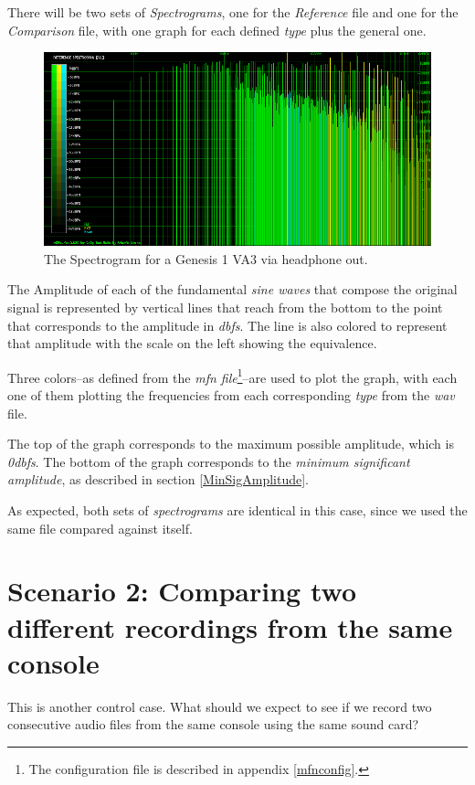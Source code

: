 \documentclass[10pt,a4paper]{report}
\newcommand{\ac}[1]{\textit{\acrshort{#1}}}
\newcommand{\db}[1]{\textit{#1\acrshort{dbfs}}}
\begin{document}
There will be two sets of \textit{Spectrograms}, one for the \textit{Reference} file and one for the \textit{Comparison} file, with one graph for each defined \textit{type} plus the general one.

\begin{figure}[H]
	\centering
	\includegraphics[width=1.0\linewidth]{images/interpretation/Plot1-SameFile-Spectrogram.png}
	\caption[Spectrogram]{The Spectrogram for a Genesis 1 VA3 via headphone out.}
	\label{fig:plot2-samefile-fm-spectrogram}
\end{figure}

The Amplitude of each of the fundamental \textit{sine waves} that compose the original signal is represented by vertical lines that reach from the bottom to the point that corresponds to the amplitude in \ac{dbfs}. The line is also colored to represent that amplitude with the scale on the left showing the equivalence.

Three colors--as defined from the \textit{mfn file}\footnote{The configuration file is described in appendix \ref{mfnconfig}.}--are used to plot the graph, with each one of them plotting the frequencies from each corresponding \textit{type} from the \ac{wav} file.

The top of the graph corresponds to the maximum possible amplitude, which is \db{0}. The bottom of the graph corresponds to the \textit{minimum significant amplitude}, as described in section \ref{MinSigAmplitude}.

As expected, both sets of \textit{spectrograms} are identical in this case, since we used the same file compared against itself.

\section{Scenario 2: Comparing two different recordings from the same console}
\label{scenario2}
This is another control case. What should we expect to see if we record two consecutive audio files from the same console using the same sound card?
\end{document}
